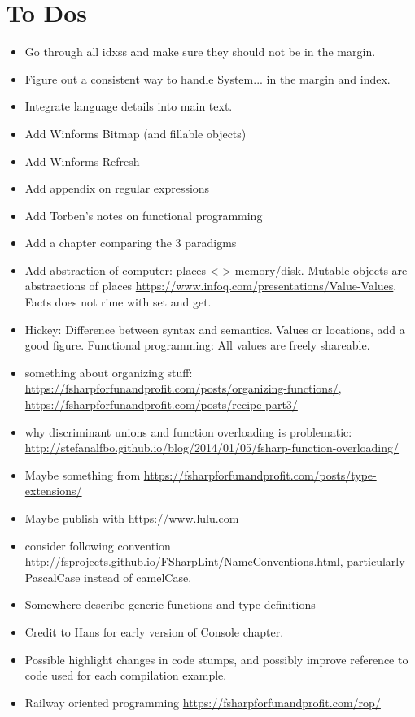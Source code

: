 \documentclass[fsharpnotes.tex]{subfiles}
\begin{document}
\chapter{To Dos}
\begin{itemize}
\item Go through all idxss and make sure they should not be in the
  margin.
\item Figure out a consistent way to handle System... in the margin
  and index.
\item Integrate language details into main text.
\item Add Winforms Bitmap (and fillable objects)
\item Add Winforms Refresh
\item Add appendix on regular expressions
\item Add Torben's notes on functional programming
\item Add a chapter comparing the 3 paradigms
\item Add abstraction of computer: places <-> memory/disk. Mutable objects are abstractions of places \url{https://www.infoq.com/presentations/Value-Values}. Facts does not rime with set and get. 
\item Hickey: Difference between syntax and semantics. Values or locations, add a good figure. Functional programming: All values are freely shareable.
\item something about organizing stuff: \url{https://fsharpforfunandprofit.com/posts/organizing-functions/}, \url{https://fsharpforfunandprofit.com/posts/recipe-part3/}
\item why discriminant unions and function overloading is problematic: \url{http://stefanalfbo.github.io/blog/2014/01/05/fsharp-function-overloading/}
\item Maybe something from \url{https://fsharpforfunandprofit.com/posts/type-extensions/}
\item Maybe publish with \url{https://www.lulu.com}
\item consider following convention \url{http://fsprojects.github.io/FSharpLint/NameConventions.html},  particularly PascalCase instead of camelCase.
\item Somewhere describe generic functions and type definitions
\item Credit to Hans for early version of Console chapter.
\item Possible highlight changes in code stumps, and possibly improve reference to code used for each compilation example.
\item Railway oriented programming \url{https://fsharpforfunandprofit.com/rop/}

\end{itemize}
\end{document}
